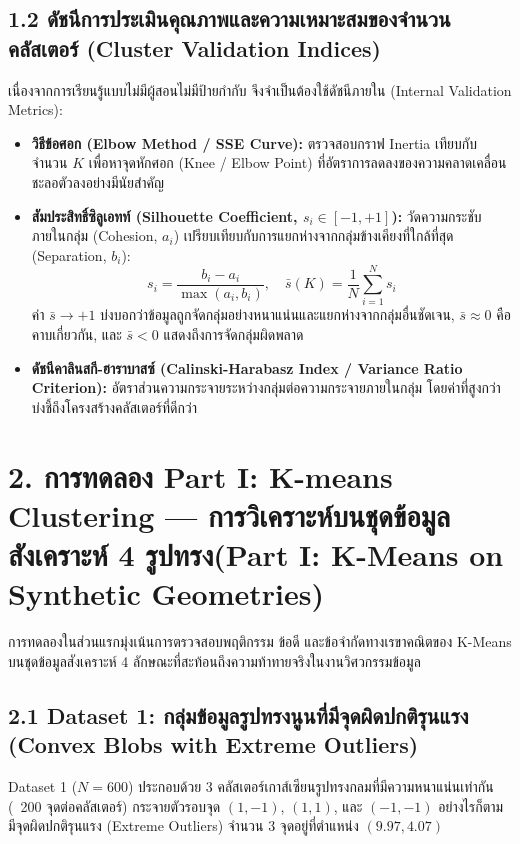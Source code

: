 \documentclass[12pt,a4paper]{article}
\begin{document}
\subsection*{1.2 ดัชนีการประเมินคุณภาพและความเหมาะสมของจำนวนคลัสเตอร์ (Cluster Validation Indices)}
เนื่องจากการเรียนรู้แบบไม่มีผู้สอนไม่มีป้ายกำกับ จึงจำเป็นต้องใช้ดัชนีภายใน (Internal Validation Metrics):
\begin{itemize}[leftmargin=1.5em, itemsep=2pt]
    \item \textbf{วิธีข้อศอก (Elbow Method / SSE Curve):} ตรวจสอบกราฟ Inertia เทียบกับจำนวน $K$ เพื่อหาจุดหักศอก (Knee / Elbow Point) ที่อัตราการลดลงของความคลาดเคลื่อนชะลอตัวลงอย่างมีนัยสำคัญ
    \item \textbf{สัมประสิทธิ์ซิลูเอทท์ (Silhouette Coefficient, $s_i \in [-1, +1]$):} วัดความกระชับภายในกลุ่ม (Cohesion, $a_i$) เปรียบเทียบกับการแยกห่างจากกลุ่มข้างเคียงที่ใกล้ที่สุด (Separation, $b_i$):
    \begin{equation}
        s_i = \frac{b_i - a_i}{\max(a_i, b_i)}, \quad \bar{s}(K) = \frac{1}{N}\sum_{i=1}^N s_i
    \end{equation}
    ค่า $\bar{s} \to +1$ บ่งบอกว่าข้อมูลถูกจัดกลุ่มอย่างหนาแน่นและแยกห่างจากกลุ่มอื่นชัดเจน, $\bar{s} \approx 0$ คือคาบเกี่ยวกัน, และ $\bar{s} < 0$ แสดงถึงการจัดกลุ่มผิดพลาด
    \item \textbf{ดัชนีคาลินสกี-ฮาราบาสซ์ (Calinski-Harabasz Index / Variance Ratio Criterion):} อัตราส่วนความกระจายระหว่างกลุ่มต่อความกระจายภายในกลุ่ม โดยค่าที่สูงกว่าบ่งชี้ถึงโครงสร้างคลัสเตอร์ที่ดีกว่า
\end{itemize}

\section*{2. การทดลอง \textcolor{partorange}{Part I: K-means Clustering} — การวิเคราะห์บนชุดข้อมูลสังเคราะห์ 4 รูปทรง\newline \large(\textcolor{partorange}{Part I: K-Means on Synthetic Geometries})}

การทดลองในส่วนแรกมุ่งเน้นการตรวจสอบพฤติกรรม ข้อดี และข้อจำกัดทางเรขาคณิตของ K-Means บนชุดข้อมูลสังเคราะห์ 4 ลักษณะที่สะท้อนถึงความท้าทายจริงในงานวิศวกรรมข้อมูล

\subsection*{2.1 Dataset 1: กลุ่มข้อมูลรูปทรงนูนที่มีจุดผิดปกติรุนแรง (Convex Blobs with Extreme Outliers)}
Dataset 1 ($N=600$) ประกอบด้วย 3 คลัสเตอร์เกาส์เซียนรูปทรงกลมที่มีความหนาแน่นเท่ากัน (~200 จุดต่อคลัสเตอร์) กระจายตัวรอบจุด $(1, -1)$, $(1, 1)$, และ $(-1, -1)$ อย่างไรก็ตาม มีจุดผิดปกติรุนแรง (Extreme Outliers) จำนวน 3 จุดอยู่ที่ตำแหน่ง $(9.97, 4.07)$ 
\end{document}
